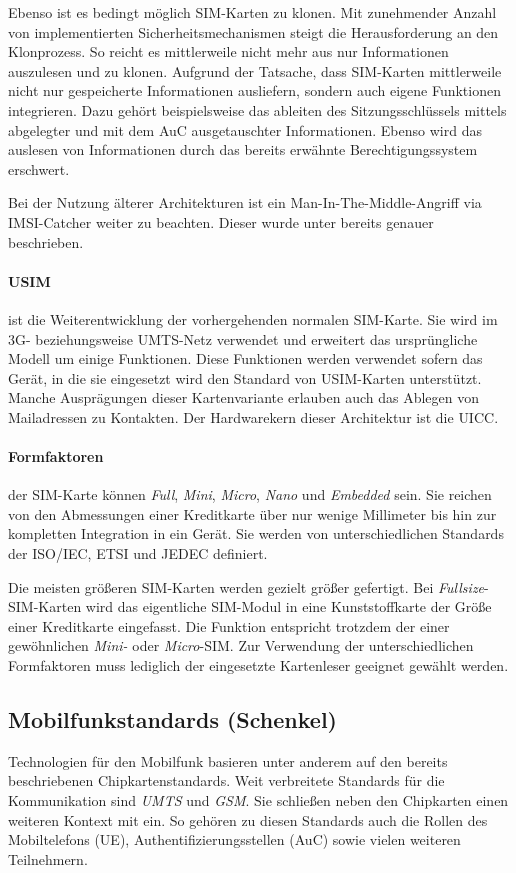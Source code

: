 Ebenso ist es bedingt möglich SIM-Karten zu klonen. Mit zunehmender Anzahl von implementierten
Sicherheitsmechanismen steigt die Herausforderung an den Klonprozess. So reicht es mittlerweile
nicht mehr aus nur Informationen auszulesen und zu klonen.
Aufgrund der Tatsache, dass SIM-Karten mittlerweile nicht nur gespeicherte Informationen
ausliefern, sondern auch eigene Funktionen integrieren.
Dazu gehört beispielsweise das ableiten des Sitzungsschlüssels
mittels abgelegter und mit dem \ac{AuC} ausgetauschter Informationen. Ebenso wird das auslesen
von Informationen durch das bereits erwähnte Berechtigungssystem erschwert.

Bei der Nutzung älterer Architekturen ist ein Man-In-The-Middle-Angriff via IMSI-Catcher weiter
zu beachten. Dieser wurde unter  bereits genauer beschrieben.

\paragraph{\ac{USIM}} ist die Weiterentwicklung der vorhergehenden normalen \ac{SIM}-Karte. Sie wird
im 3G- beziehungsweise UMTS-Netz verwendet und erweitert das ursprüngliche Modell um einige Funktionen.
Diese Funktionen werden verwendet sofern das Gerät, in die sie eingesetzt wird den Standard
von USIM-Karten unterstützt. Manche Ausprägungen dieser Kartenvariante erlauben auch das Ablegen
von Mailadressen zu Kontakten. Der Hardwarekern dieser Architektur ist die \ac{UICC}.

\paragraph{Formfaktoren} der SIM-Karte können \textit{Full}, \textit{Mini}, \textit{Micro},
\textit{Nano} und \textit{Embedded} sein. Sie reichen von den Abmessungen einer Kreditkarte über
nur wenige Millimeter bis hin zur kompletten Integration in ein Gerät. Sie werden von unterschiedlichen
Standards der ISO/IEC, ETSI und JEDEC definiert.

Die meisten größeren SIM-Karten werden gezielt größer gefertigt. Bei \textit{Fullsize}-SIM-Karten
wird das eigentliche SIM-Modul in eine Kunststoffkarte der Größe einer Kreditkarte eingefasst.
Die Funktion entspricht trotzdem der einer gewöhnlichen \textit{Mini-} oder \textit{Micro}-SIM.
Zur Verwendung der unterschiedlichen Formfaktoren muss lediglich der eingesetzte Kartenleser
geeignet gewählt werden.

\subsection{Mobilfunkstandards (Schenkel)} %
Technologien für den Mobilfunk basieren unter anderem auf den bereits beschriebenen
Chipkartenstandards. Weit verbreitete Standards für die Kommunikation sind
\textit{UMTS} und \textit{GSM}. Sie schließen neben den Chipkarten einen weiteren
Kontext mit ein. So gehören zu diesen Standards auch die Rollen des Mobiltelefons (UE),
Authentifizierungsstellen (\ac{AuC}) sowie vielen weiteren Teilnehmern.

